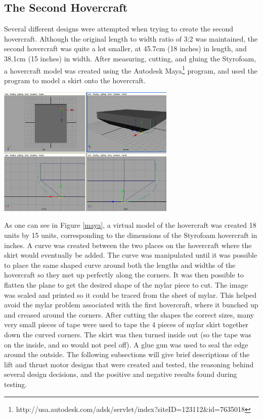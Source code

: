 \begin{minipage}{6.5in}
\begin{minipage}{6.5in}
\subsection{The Second Hovercraft}
Several different designs were attempted when trying to create the second hovercraft. Although the original length to width ratio
of 3:2 was maintained, the second hovercraft was quite a lot smaller, at 45.7cm (18 inches) in length, and 38.1cm (15 inches) in width.
After measuring, cutting, and gluing the Styrofoam, a hovercraft model was created using the Autodesk Maya\footnote{ http://usa.autodesk.com/adsk/servlet/index?siteID=123112\&id=7635018 }
program, and used the program to model a skirt onto the hovercraft.

\begin{minipage}{6.5in}
\begin{center}
  \includegraphics[width=85mm]{imageSources/maya.png}
\end{center}
\label{maya}
\end{minipage}

As one can see in Figure \ref{maya}, a virtual model of the hovercraft was created 18 units by 15 units, corresponding
to the dimensions of the Styrofoam hovercraft in inches.  A curve was created between the two places on the hovercraft where the skirt would eventually be added.
The curve was manipulated until it was possible to place the same shaped curve around both the lengths and widths of the hovercraft
so they met up perfectly along the corners. It was then possible to flatten the plane to get the desired shape of the mylar piece 
to cut. The image was scaled and printed so it could be traced from the sheet of mylar. This helped avoid the mylar
problem associated with the first hovercraft, where it bunched up and creased around the corners. After cutting the shapes the correct sizes,  many very small pieces of tape were used to tape the 4 pieces of mylar skirt together down the curved corners.  The skirt was then turned inside out (so the tape was on the inside,
and so would not peel off).  A glue gun was used to seal the edge around the outside.  The following subsections will give
brief descriptions of the lift and thrust motor designs that were created and tested, the reasoning behind several design decisions, and the positive and negative results found during testing.


\end{minipage}
\end{minipage}
